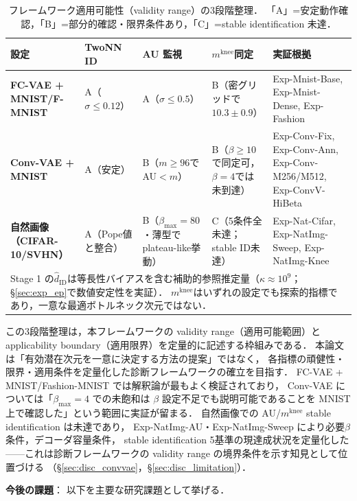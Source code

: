 \documentclass[11pt,a4paper]{jsarticle}
\newcommand{\kap}{\kappa}
\newcommand{\mknee}{m^{\mathrm{knee}}}
\begin{document}
\begin{table}[H]
\centering
\caption{フレームワーク適用可能性（validity range）の3段階整理．
「A」=安定動作確認，「B」=部分的確認・限界条件あり，「C」=stable identification 未達．}
\label{tab:applicability_tier}
\small
\begin{tabular}{p{3.5cm}p{2.6cm}p{2.4cm}p{2.4cm}p{3.5cm}}
\toprule
設定 & TwoNN ID & AU 監視 & $\mknee$同定 & 実証根拠 \\
\midrule
\textbf{FC-VAE +} \textbf{MNIST/F-MNIST}
  & A（$\sigma\leq0.12$）
  & A（$\sigma\leq0.5$）
  & B（密グリッドで$10.3\pm0.9$）
  & Exp-Mnist-Base, Exp-Mnist-Dense, Exp-Fashion \\
\addlinespace
\textbf{Conv-VAE + MNIST}
  & A（安定）
  & B（$m\geq96$で AU$<m$）
  & B（$\beta\geq10$で同定可，$\beta=4$では未到達）
  & Exp-Conv-Fix, Exp-Conv-Ann, Exp-Conv-M256/M512, Exp-ConvV-HiBeta \\
\addlinespace
\textbf{自然画像}
\textbf{（CIFAR-10/SVHN）}
  & A（Pope値と整合）
  & B（$\beta_{\max}=80$・薄型でplateau-like挙動）
  & C（5条件全未達；stable ID未達）
  & Exp-Nat-Cifar, Exp-NatImg-Sweep, Exp-NatImg-Knee \\
\midrule
\multicolumn{5}{p{14.5cm}}{\small
Stage 1 の$\hat{d}_\mathrm{ID}$は等長性バイアスを含む補助的参照推定量（$\kap\approx10^9$；§\ref{sec:exp_ep}で数値安定性を実証）．
$\mknee$はいずれの設定でも探索的指標であり，一意な最適ボトルネック次元ではない．}\\
\bottomrule
\end{tabular}
\end{table}

この3段階整理は，本フレームワークの validity range（適用可能範囲）と
applicability boundary（適用限界）を定量的に記述する枠組みである．
本論文は「有効潜在次元を一意に決定する方法の提案」ではなく，
各指標の頑健性・限界・適用条件を定量化した診断フレームワークの確立を目指す．
FC-VAE + MNIST/Fashion-MNIST では解釈論が最もよく検証されており，
Conv-VAE については「$\beta_{\max}=4$ での未飽和は $\beta$ 設定不足でも説明可能であることを MNIST 上で確認した」という範囲に実証が留まる．
自然画像での AU/$\mknee$ stable identification は未達であり，
Exp-NatImg-AU・Exp-NatImg-Sweep により必要$\beta$条件，デコーダ容量条件，
stable identification 5基準の現達成状況を定量化した——これは診断フレームワークの
validity range の境界条件を示す知見として位置づける
（§\ref{sec:disc_convvae}，§\ref{sec:disc_limitation}）．

\textbf{今後の課題}：
以下を主要な研究課題として挙げる．
\end{document}
